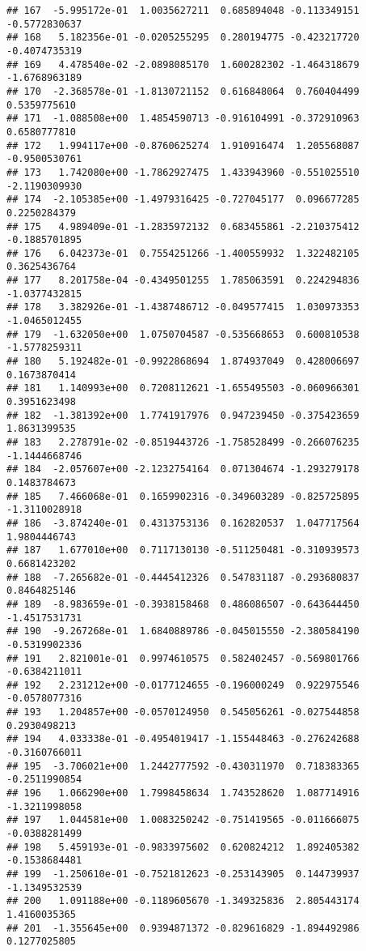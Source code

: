 \documentclass[
]{article}
\begin{document}
\begin{verbatim}
## 167  -5.995172e-01  1.0035627211  0.685894048 -0.113349151 -0.5772830637
## 168   5.182356e-01 -0.0205255295  0.280194775 -0.423217720 -0.4074735319
## 169   4.478540e-02 -2.0898085170  1.600282302 -1.464318679 -1.6768963189
## 170  -2.368578e-01 -1.8130721152  0.616848064  0.760404499  0.5359775610
## 171  -1.088508e+00  1.4854590713 -0.916104991 -0.372910963  0.6580777810
## 172   1.994117e+00 -0.8760625274  1.910916474  1.205568087 -0.9500530761
## 173   1.742080e+00 -1.7862927475  1.433943960 -0.551025510 -2.1190309930
## 174  -2.105385e+00 -1.4979316425 -0.727045177  0.096677285  0.2250284379
## 175   4.989409e-01 -1.2835972132  0.683455861 -2.210375412 -0.1885701895
## 176   6.042373e-01  0.7554251266 -1.400559932  1.322482105  0.3625436764
## 177   8.201758e-04 -0.4349501255  1.785063591  0.224294836 -1.0377432815
## 178   3.382926e-01 -1.4387486712 -0.049577415  1.030973353 -1.0465012455
## 179  -1.632050e+00  1.0750704587 -0.535668653  0.600810538 -1.5778259311
## 180   5.192482e-01 -0.9922868694  1.874937049  0.428006697  0.1673870414
## 181   1.140993e+00  0.7208112621 -1.655495503 -0.060966301  0.3951623498
## 182  -1.381392e+00  1.7741917976  0.947239450 -0.375423659  1.8631399535
## 183   2.278791e-02 -0.8519443726 -1.758528499 -0.266076235 -1.1444668746
## 184  -2.057607e+00 -2.1232754164  0.071304674 -1.293279178  0.1483784673
## 185   7.466068e-01  0.1659902316 -0.349603289 -0.825725895 -1.3110028918
## 186  -3.874240e-01  0.4313753136  0.162820537  1.047717564  1.9804446743
## 187   1.677010e+00  0.7117130130 -0.511250481 -0.310939573  0.6681423202
## 188  -7.265682e-01 -0.4445412326  0.547831187 -0.293680837  0.8464825146
## 189  -8.983659e-01 -0.3938158468  0.486086507 -0.643644450 -1.4517531731
## 190  -9.267268e-01  1.6840889786 -0.045015550 -2.380584190 -0.5319902336
## 191   2.821001e-01  0.9974610575  0.582402457 -0.569801766 -0.6384211011
## 192   2.231212e+00 -0.0177124655 -0.196000249  0.922975546 -0.0578077316
## 193   1.204857e+00 -0.0570124950  0.545056261 -0.027544858  0.2930498213
## 194   4.033338e-01 -0.4954019417 -1.155448463 -0.276242688 -0.3160766011
## 195  -3.706021e+00  1.2442777592 -0.430311970  0.718383365 -0.2511990854
## 196   1.066290e+00  1.7998458634  1.743528620  1.087714916 -1.3211998058
## 197   1.044581e+00  1.0083250242 -0.751419565 -0.011666075 -0.0388281499
## 198   5.459193e-01 -0.9833975602  0.620824212  1.892405382 -0.1538684481
## 199  -1.250610e-01 -0.7521812623 -0.253143905  0.144739937 -1.1349532539
## 200   1.091188e+00 -0.1189605670 -1.349325836  2.805443174  1.4160035365
## 201  -1.355645e+00  0.9394871372 -0.829616829 -1.894492986  0.1277025805

\end{verbatim}
\end{document}
